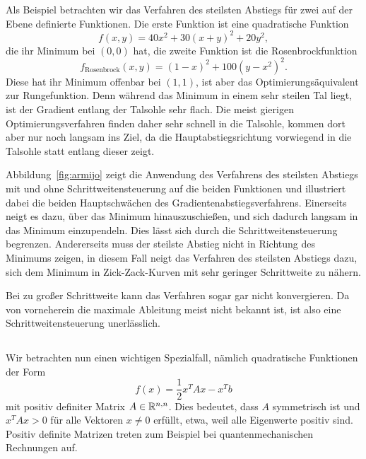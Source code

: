Als Beispiel betrachten wir das Verfahren des steilsten Abstiegs für
zwei auf der Ebene definierte Funktionen. Die erste Funktion ist eine
quadratische Funktion
\begin{equation}
  \label{eq:quadgl}
  f(x, y) = 40 x^2 + 30(x + y)^2 + 20 y^2,
\end{equation}
die ihr Minimum bei $(0,0)$ hat, die zweite Funktion ist die
Rosenbrockfunktion
\begin{equation}
  f_{\text{Rosenbrock}}(x, y) = (1-x)^2 + 100(y-x^2)^2.
\end{equation}
Diese hat ihr Minimum offenbar bei $(1,1)$, ist aber das
Optimierungsäquivalent zur Rungefunktion. Denn während das Minimum in
einem sehr steilen Tal liegt, ist der Gradient entlang der Talsohle
sehr flach. Die meist gierigen Optimierungsverfahren finden daher sehr
schnell in die Talsohle, kommen dort aber nur noch langsam ins Ziel,
da die Hauptabstiegsrichtung vorwiegend in die Talsohle statt
entlang dieser zeigt.

Abbildung~\ref{fig:armijo} zeigt die Anwendung des Verfahrens des
steilsten Abstiegs mit und ohne Schrittweitensteuerung auf die beiden
Funktionen und illustriert dabei die beiden Hauptschwächen des
Gradientenabstiegsverfahrens. Einerseits neigt es dazu, über das
Minimum hinauszuschießen, und sich dadurch langsam in das Minimum
einzupendeln. Dies lässt sich durch die Schrittweitensteuerung
begrenzen. Andererseits muss der steilste Abstieg nicht in Richtung
des Minimums zeigen, in diesem Fall neigt das Verfahren des steilsten
Abstiegs dazu, sich dem Minimum in Zick-Zack-Kurven mit sehr geringer
Schrittweite zu nähern.

Bei zu großer Schrittweite kann das Verfahren sogar gar nicht
konvergieren. Da von vorneherein die maximale Ableitung meist nicht
bekannt ist, ist also eine Schrittweitensteuerung unerlässlich.

\subsection{}

Wir betrachten nun einen wichtigen Spezialfall, nämlich quadratische
Funktionen der Form
\begin{equation}
  \label{eq:cgfunktion}
  f(x) = \frac{1}{2}x^TAx - x^Tb
\end{equation}
mit positiv definiter Matrix $A\in\mathbb{R}^{n,n}$.  Dies bedeutet, dass $A$
symmetrisch ist und $x^TAx>0$ für alle Vektoren $x\neq 0$ erfüllt,
etwa, weil alle Eigenwerte positiv sind.  Positiv definite Matrizen
treten zum Beispiel bei quantenmechanischen Rechnungen auf.

